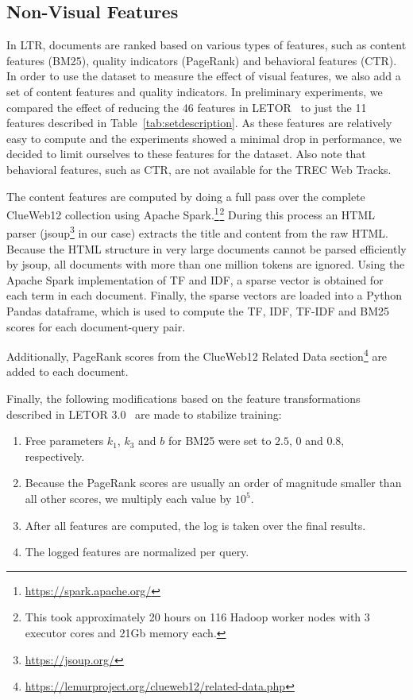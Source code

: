 \subsection{Non-Visual Features} 
\label{sec:contentfeature}
In LTR, documents are ranked based on various types of features, such as content features (BM25), quality indicators (PageRank) and behavioral features (CTR).
In order to use the \datasetname{} dataset to measure the effect of visual features, we also add a set of content features and quality indicators.
In preliminary experiments, we compared the effect of reducing the 46 features in LETOR~\cite{qin2010letor} to just the 11 features described in Table~\ref{tab:setdescription}.
As these features are relatively easy to compute and the experiments showed a minimal drop in performance, we decided to limit ourselves to these features for the \datasetname{} dataset.
Also note that behavioral features, such as CTR, are not available for the TREC Web Tracks.

The content features are computed by doing a full pass over the complete ClueWeb12 collection using Apache Spark.\footnote{\url{https://spark.apache.org/}}$^{ }$\footnote{This took approximately 20 hours on 116 Hadoop worker nodes with 3 executor cores and 21Gb memory each.}
During this process an HTML parser (jsoup\footnote{\url{https://jsoup.org/}} in our case) extracts the title and content from the raw HTML.
Because the HTML structure in very large documents cannot be parsed efficiently by jsoup, all documents with more than one million tokens are ignored.
Using the Apache Spark implementation of TF and IDF, a sparse vector is obtained for each term in each document. Finally, the sparse vectors are loaded into a Python Pandas dataframe, which is used to compute the TF, IDF, TF-IDF and BM25 scores for each document-query pair.

Additionally, PageRank scores from the ClueWeb12 Related Data section\footnote{\url{https://lemurproject.org/clueweb12/related-data.php}} are added to each document.

Finally, the following modifications based on the feature transformations described in LETOR 3.0~\cite{qin2010letor} are made to stabilize training:
\begin{enumerate}[nosep,leftmargin=14pt]
\item Free parameters $k_1$, $k_3$ and $b$ for BM25 were set to $2.5$, $0$ and $0.8$, respectively. 
\item Because the PageRank scores are usually an order of magnitude smaller than all other scores, we multiply each value by $10^5$.
\item After all features are computed, the log is taken over the final results.
\item The logged features are normalized per query.  
\end{enumerate}


